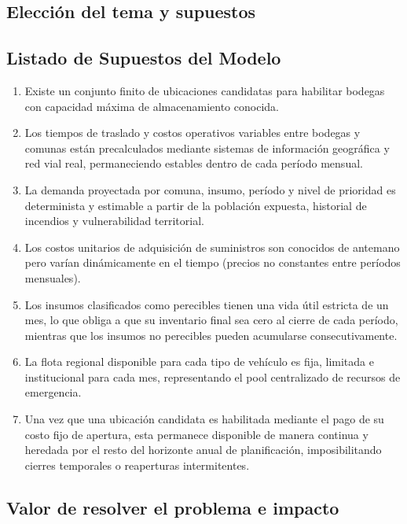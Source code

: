 \documentclass[letterpaper]{article}
\begin{document}
\begin{flushleft}
\section{Elecci\'on del tema y supuestos}

\subsection{Listado de Supuestos del Modelo}

\begin{enumerate}[leftmargin=2em, itemsep=2pt]
  \item Existe un conjunto finito de ubicaciones candidatas para habilitar bodegas con capacidad m\'axima de almacenamiento conocida.
  \item Los tiempos de traslado y costos operativos variables entre bodegas y comunas est\'an precalculados mediante sistemas de informaci\'on geogr\'afica y red vial real, permaneciendo estables dentro de cada per\'iodo mensual.
  \item La demanda proyectada por comuna, insumo, per\'iodo y nivel de prioridad es determinista y estimable a partir de la poblaci\'on expuesta, historial de incendios y vulnerabilidad territorial.
  \item Los costos unitarios de adquisici\'on de suministros son conocidos de antemano pero var\'ian din\'amicamente en el tiempo (precios no constantes entre per\'iodos mensuales).
  \item Los insumos clasificados como perecibles tienen una vida \'util estricta de un mes, lo que obliga a que su inventario final sea cero al cierre de cada per\'iodo, mientras que los insumos no perecibles pueden acumularse consecutivamente.
  \item La flota regional disponible para cada tipo de veh\'iculo es fija, limitada e institucional para cada mes, representando el pool centralizado de recursos de emergencia.
  \item Una vez que una ubicaci\'on candidata es habilitada mediante el pago de su costo fijo de apertura, esta permanece disponible de manera continua y heredada por el resto del horizonte anual de planificaci\'on, imposibilitando cierres temporales o reaperturas intermitentes.
\end{enumerate}

\subsection{Valor de resolver el problema e impacto}


\end{flushleft}
\end{document}
